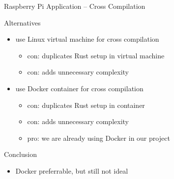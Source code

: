 \documentclass[aspectratio=169]{beamer}
\newcommand\green[1]{{\color{green(ncs)}#1}}
\newcommand\red[1]{{\color{amaranth}#1}}
\begin{document}
  \begin{frame}{Raspberry Pi Application -- Cross Compilation}
    \begin{block}{Alternatives}
      \begin{itemize}
        \item use Linux virtual machine for cross compilation
        \begin{itemize}
          \item \red{con:} duplicates Rust setup in virtual machine
          \item \red{con:} adds unnecessary complexity
        \end{itemize}
        \item use Docker container for cross compilation
        \begin{itemize}
          \item \red{con:} duplicates Rust setup in container
          \item \red{con:} adds unnecessary complexity
          \item \green{pro:} we are already using Docker in our project
        \end{itemize}
      \end{itemize}
    \end{block}

     {
    \begin{block}{Conclusion}
      \begin{itemize}
        \item Docker preferrable, but still not ideal
      \end{itemize}
    \end{block}
    }
  \end{frame}
\end{document}
